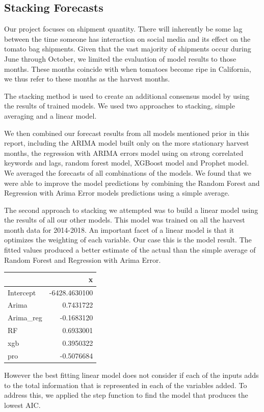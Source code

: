 \documentclass[12pt,oneside]{chicagocapstone}
\begin{document}
\subsection*{Stacking Forecasts}\label{findings-Stacking}

Our project focuses on shipment quantity. There will inherently be some
lag between the time someone has interaction on social media and its
effect on the tomato bag shipments. Given that the vast majority of
shipments occur during June through October, we limited the evaluation
of model results to those months. These months coincide with when
tomatoes become ripe in California, we thus refer to these months as the
harvest months.

The stacking method is used to create an additional consensus model by
using the results of trained models. We used two approaches to stacking,
simple averaging and a linear model.

We then combined our forecast results from all models mentioned prior in
this report, including the ARIMA model built only on the more stationary
harvest months, the regression with ARIMA errors model using on strong
correlated keywords and lags, random forest model, XGBoost model and
Prophet model. We averaged the forecasts of all combinations of the
models. We found that we were able to improve the model predictions by
combining the Random Forest and Regression with Arima Error models
predictions using a simple average.

The second approach to stacking we attempted was to build a linear model
using the results of all our other models. This model was trained on all
the harvest month data for 2014-2018. An important facet of a linear
model is that it optimizes the weighting of each variable. Our case this
is the model result. The fitted values produced a better estimate of the
actual than the simple average of Random Forest and Regression with
Arima Error.
\begin{longtable}[]{@{}lr@{}}
\toprule
& x\tabularnewline
\midrule
\endhead
Intercept & -6428.4630100\tabularnewline
Arima & 0.7431722\tabularnewline
Arima\_reg & -0.1683120\tabularnewline
RF & 0.6933001\tabularnewline
xgb & 0.3950322\tabularnewline
pro & -0.5076684\tabularnewline
\bottomrule
\end{longtable}
However the best fitting linear model does not consider if each of the
inputs adds to the total information that is represented in each of the
variables added. To address this, we applied the step function to find
the model that produces the lowest AIC.
\end{document}

